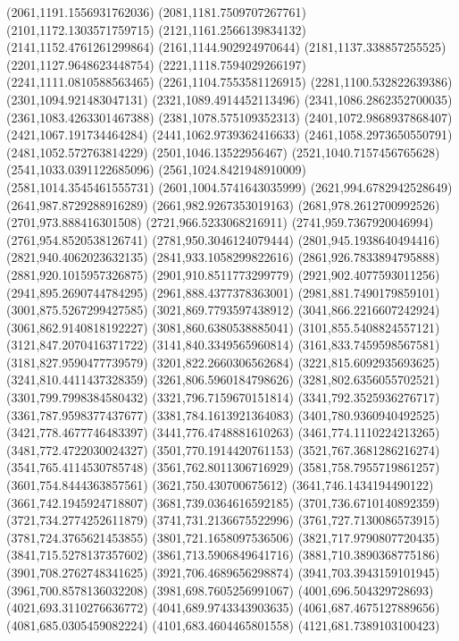 {(2061,1191.1556931762036)
(2081,1181.7509707267761)
(2101,1172.1303571759715)
(2121,1161.2566139834132)
(2141,1152.4761261299864)
(2161,1144.902924970644)
(2181,1137.338857255525)
(2201,1127.9648623448754)
(2221,1118.7594029266197)
(2241,1111.0810588563465)
(2261,1104.7553581126915)
(2281,1100.532822639386)
(2301,1094.921483047131)
(2321,1089.4914452113496)
(2341,1086.2862352700035)
(2361,1083.4263301467388)
(2381,1078.575109352313)
(2401,1072.9868937868407)
(2421,1067.191734464284)
(2441,1062.9739362416633)
(2461,1058.2973650550791)
(2481,1052.572763814229)
(2501,1046.13522956467)
(2521,1040.7157456765628)
(2541,1033.0391122685096)
(2561,1024.8421948910009)
(2581,1014.3545461555731)
(2601,1004.5741643035999)
(2621,994.6782942528649)
(2641,987.8729288916289)
(2661,982.9267353019163)
(2681,978.2612700992526)
(2701,973.888416301508)
(2721,966.5233068216911)
(2741,959.7367920046994)
(2761,954.8520538126741)
(2781,950.3046124079444)
(2801,945.1938640494416)
(2821,940.4062023632135)
(2841,933.1058299822616)
(2861,926.7833894795888)
(2881,920.1015957326875)
(2901,910.8511773299779)
(2921,902.4077593011256)
(2941,895.2690744784295)
(2961,888.4377378363001)
(2981,881.7490179859101)
(3001,875.5267299427585)
(3021,869.7793597438912)
(3041,866.2216607242924)
(3061,862.9140818192227)
(3081,860.6380538885041)
(3101,855.5408824557121)
(3121,847.2070416371722)
(3141,840.3349565960814)
(3161,833.7459598567581)
(3181,827.9590477739579)
(3201,822.2660306562684)
(3221,815.6092935693625)
(3241,810.4411437328359)
(3261,806.5960184798626)
(3281,802.6356055702521)
(3301,799.7998384580432)
(3321,796.7159670151814)
(3341,792.3525936276717)
(3361,787.9598377437677)
(3381,784.1613921364083)
(3401,780.9360940492525)
(3421,778.4677746483397)
(3441,776.4748881610263)
(3461,774.1110224213265)
(3481,772.4722030024327)
(3501,770.1914420761153)
(3521,767.3681286216274)
(3541,765.4114530785748)
(3561,762.8011306716929)
(3581,758.7955719861257)
(3601,754.8444363857561)
(3621,750.430700675612)
(3641,746.1434194490122)
(3661,742.1945924718807)
(3681,739.0364616592185)
(3701,736.6710140892359)
(3721,734.2774252611879)
(3741,731.2136675522996)
(3761,727.7130086573915)
(3781,724.3765621453855)
(3801,721.1658097536506)
(3821,717.9790807720435)
(3841,715.5278137357602)
(3861,713.5906849641716)
(3881,710.3890368775186)
(3901,708.2762748341625)
(3921,706.4689656298874)
(3941,703.3943159101945)
(3961,700.8578136032208)
(3981,698.7605256991067)
(4001,696.504329728693)
(4021,693.3110276636772)
(4041,689.9743343903635)
(4061,687.4675127889656)
(4081,685.0305459082224)
(4101,683.4604465801558)
(4121,681.7389103100423)
}
